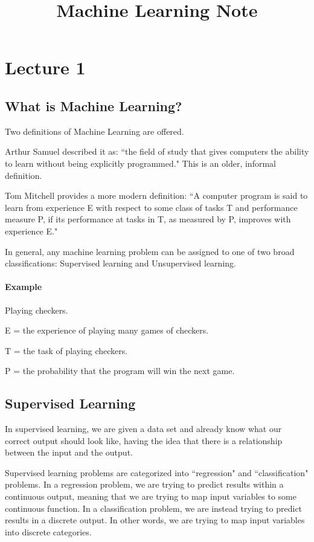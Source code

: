 \documentclass[UTF8]{article}
\title{Machine Learning Note}
\date{}
\begin{document}
\maketitle
\tableofcontents

\section{Lecture 1}

\subsection{What is Machine Learning?}
Two definitions of Machine Learning are offered. 

Arthur Samuel described it as: ``the field of study that gives computers the ability to learn without being explicitly programmed." This is an older, informal definition.

Tom Mitchell provides a more modern definition: ``A computer program is said to learn from experience E with respect to some class of tasks T and performance measure P, if its performance at tasks in T, as measured by P, improves with experience E."

In general, any machine learning problem can be assigned to one of two broad classifications: Supervised learning and Unsupervised learning.

\paragraph{Example}Playing checkers.

E = the experience of playing many games of checkers.

T = the task of playing checkers.

P = the probability that the program will win the next game.

\subsection{Supervised Learning}

In supervised learning, we are given a data set and already know what our correct output should look like, having the idea that there is a relationship between the input and the output.

Supervised learning problems are categorized into ``regression" and ``classification" problems. In a regression problem, we are trying to predict results within a continuous output, meaning that we are trying to map input variables to some continuous function. In a classification problem, we are instead trying to predict results in a discrete output. In other words, we are trying to map input variables into discrete categories.
\end{document}
